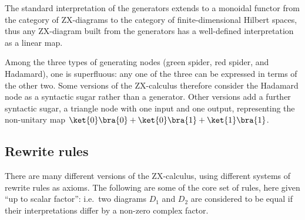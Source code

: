 \documentclass[a4paper, 12pt]{article}
\begin{document}
The standard interpretation of the generators extends to a monoidal functor from the category of ZX-diagrams to the category of finite-dimensional Hilbert spaces, thus any ZX-diagram built from the generators has a well-defined interpretation as a linear map.

Among the three types of generating nodes (green spider, red spider, and Hadamard), one is superfluous: any one of the three can be expressed in terms of the other two. Some versions of the ZX-calculus therefore consider the Hadamard node as a syntactic sugar rather than a generator. Other versions add a further syntactic sugar, a triangle node with one input and one output, representing the non-unitary map $\ket{0}\bra{0}+\ket{0}\bra{1}+\ket{1}\bra{1}$.


\subsection{Rewrite rules}

There are many different versions of the ZX-calculus, using different systems of rewrite rules as axioms. The following are some of the core set of rules, here given ``up to scalar factor'': i.e.\ two diagrams $D_1$ and $D_2$ are considered to be equal if their interpretations differ by a non-zero complex factor.
\end{document}
